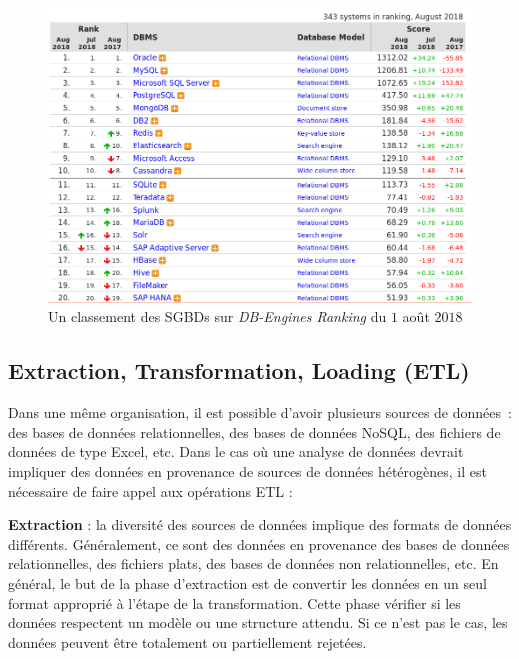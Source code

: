 		\begin{figure}[h]
			\centering
			\captionsetup{justification=centering}
			\includegraphics[width=1\linewidth]{illustrations/ranking-db}
			\caption{Un classement des SGBDs sur \textit{DB-Engines Ranking} du $1$ août $2018$ }
			\label{fig:ranking-db}
		\end{figure}
		
		\subsection{Extraction, Transformation, Loading (ETL)} \label{sec:etl}
		Dans une même organisation, il est possible d'avoir plusieurs sources de données~: des bases de données relationnelles, des bases de données NoSQL, des fichiers de données de type Excel, etc. 
		Dans le cas où une analyse de données devrait impliquer des données en provenance de  sources  de données hétérogènes, il est nécessaire de faire appel aux opérations ETL :
		
		\textbf{Extraction} :  la diversité des sources de données implique des formats de données différents. Généralement, ce sont des données en provenance des bases de données relationnelles, des fichiers plats, des bases de données non relationnelles,  etc. En général,  le but de la phase d'extraction est de convertir les données en un seul format approprié à l'étape de la transformation. Cette phase  vérifier si les données respectent un modèle ou une structure attendu. Si ce n'est pas le cas, les données peuvent être totalement ou partiellement rejetées.
		
